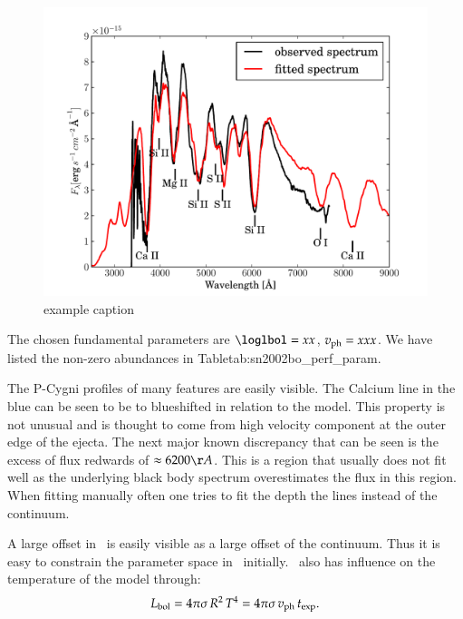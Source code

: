 \begin{figure}[htbp] %
   \centering
   \includegraphics[width=\textwidth]{chapter5/plots/bf2002bo-10.pdf} 
   \caption{example caption}
   \label{fig:sn2002bo-10_bf}
\end{figure}

The chosen fundamental parameters are $\loglbol=xx$, $v_{\rm ph}=xxx$. We have listed the non-zero abundances in Table{tab:sn2002bo_perf_param}. 

The P-Cygni profiles of many features are easily visible. The Calcium line in the blue can be seen to be to blueshifted in relation to the model. This property is not unusual and is thought to come from high velocity component at the outer edge of the ejecta. The next major known discrepancy that can be seen is the excess of flux redwards of  $\approx 6200 \AA$.  This is a region that usually does not fit well as the underlying black body spectrum overestimates the flux in this region. When fitting manually often one tries to fit the depth the lines instead of the continuum.

A large offset in \lum\ is easily visible as a large offset of the continuum. Thus it is easy to constrain the parameter space in \lum\ initially. \lum\ also has influence on the temperature of the model through:
\[
L_{\rm bol} = 4\pi\sigma\, R^2\,T^4 = 4\pi\sigma\,v_{\rm ph}\,t_{\rm exp}.
\label{eq:Lum_temp_relation}
\]









